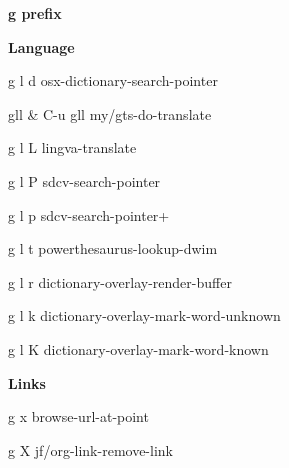 \documentclass[10pt]{article}
\renewcommand\section[1]{\bigskip\par\textbf{\color{heading}\large#1}\smallskip}
\renewcommand\subsection[1]{\smallskip\par\textbf{\color{heading}#1}}
\begin{document}
\begin{multicols}{4}
  \section{g prefix}
  \subsection{Language}
  \begin{keylist}
    \item[g l d] osx-dictionary-search-pointer
    \item[gll \& C-u gll] my/gts-do-translate
    \item[g l L] lingva-translate
    \item[g l P] sdcv-search-pointer
    \item[g l p] sdcv-search-pointer+
    \item[g l t] powerthesaurus-lookup-dwim
    \item[g l r] dictionary-overlay-render-buffer
    \item[g l k] dictionary-overlay-mark-word-unknown
    \item[g l K] dictionary-overlay-mark-word-known
  \end{keylist}
  \subsection{Links}
  \begin{keylist}
    \item[g x] browse-url-at-point
    \item[g X] jf/org-link-remove-link
  \end{keylist}
\end{multicols}
\end{document}
